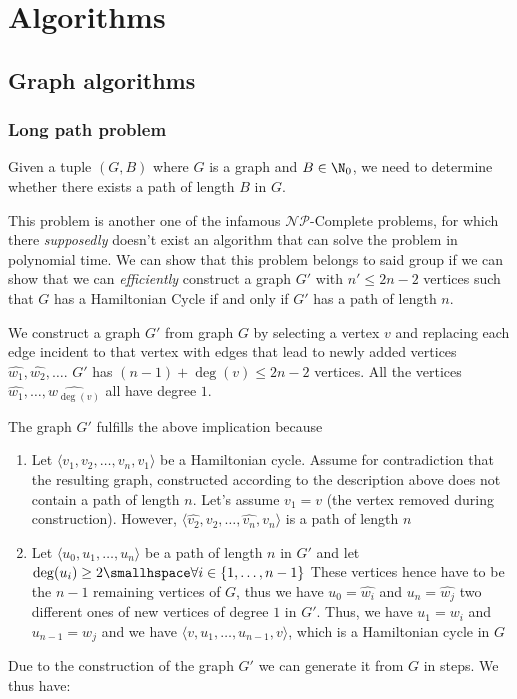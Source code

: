 \newsection
\section{Algorithms}
\subsection{Graph algorithms}

\subsubsection{Long path problem}
Given a tuple $(G, B)$ where $G$ is a graph and $B \in \N_0$, we need to determine whether there exists a path of length $B$ in $G$.

This problem is another one of the infamous $\mathcal{N}\mathcal{P}$-Complete problems, for which there \textit{supposedly} doesn't exist an algorithm that can solve the problem in polynomial time.
We can show that this problem belongs to said group if we can show that we can \textit{efficiently} construct a graph $G'$ with $n' \leq 2n - 2$ vertices such that $G$ has a Hamiltonian Cycle if and only if $G'$ has a path of length $n$.

We construct a graph $G'$ from graph $G$ by selecting a vertex $v$ and replacing each edge incident to that vertex with edges that lead to newly added vertices $\hat{w_1}, \hat{w_2}, \ldots$.
$G'$ has $(n - 1) + \deg(v) \leq 2n - 2$ vertices. All the vertices $\hat{w_1}, \ldots, \hat{w_{\deg(v)}}$ all have degree $1$.

The graph $G'$ fulfills the above implication because
\begin{enumerate}[label=(\roman*)]
    \item Let $\langle v_1, v_2, \ldots, v_n, v_1 \rangle$ be a Hamiltonian cycle.
          Assume for contradiction that the resulting graph, constructed according to the description above does not contain a path of length $n$.
          Let's assume $v_1 = v$ (the vertex removed during construction). However, $\langle \hat{v_2}, v_2, \ldots, \hat{v_n}, v_n \rangle$ is a path of length $n$
    \item Let $\langle u_0, u_1, \ldots, u_n \rangle$ be a path of length $n$ in $G'$ and let $\deg(u_i) \geq 2 \smallhspace \forall i \in \{1, \ldots, n - 1\}$ These vertices hence have to be the $n - 1$ remaining vertices of $G$, thus we have $u_0 = \hat{w_i}$ and $u_n = \hat{w_j}$ two different ones of new vertices of degree $1$ in $G'$. Thus, we have $u_1 = w_i$ and $u_{n - 1} = w_j$ and we have $\langle v, u_1, \ldots, u_{n - 1}, v \rangle$, which is a Hamiltonian cycle in $G$
\end{enumerate}
Due to the construction of the graph $G'$ we can generate it from $G$ in  steps. We thus have:

